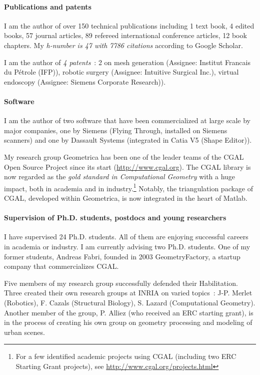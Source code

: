 \paragraph{Publications and patents} \mbox{}

I am the author of over 150 technical publications including 1 text book, 4 edited books, 57 journal articles, 89 refereed international conference articles, 12 book chapters. My {\em h-number is 47 with 7786 citations} according to Google Scholar. 

I am the author of {\em 4 patents}~: 2 on mesh generation (Assignee: Institut Francais du P\'etrole (IFP)), robotic surgery (Assignee: Intuitive Surgical Inc.), virtual endoscopy (Assignee: Siemens Corporate Research)).

\paragraph{Software} \mbox{}

I am the author of two software that have been commercialized at large scale by major companies, one by Siemens (Flying Through, installed on Siemens scanners) and one by Dassault Systems (integrated in Catia V5 (Shape Editor)). 

My research group Geometrica has been one of the leader teams of  the CGAL Open Source Project since its start (\url{http://www.cgal.org}{}).  The CGAL library  is now regarded as the {\em gold standard in Computational Geometry} with a huge impact, both in academia and in industry.\footnote{For a few identified academic projects using CGAL (including two ERC Starting Grant projects), see
\url{http://www.cgal.org/projects.html}} Notably, the triangulation package of CGAL, developed within Geometrica, is now integrated in the heart of Matlab.

\paragraph{Supervision of Ph.D. students, postdocs and young researchers} \mbox{}

I have supervised 24 Ph.D. students. All of them are enjoying successful careers in academia or industry. I am currently advising two Ph.D. students. One of my former students, Andreas Fabri, founded in 2003 GeometryFactory, a startup company that commercializes CGAL.

Five members of my research group successfully defended their Habilitation.  Three created their own research groups at INRIA on varied topics~: J-P. Merlet (Robotics), F. Cazals (Structural Biology), S. Lazard (Computational Geometry). Another member of the group, P. Alliez (who received an ERC starting grant), is in the process of creating his own group on geometry processing and modeling of urban scenes.

